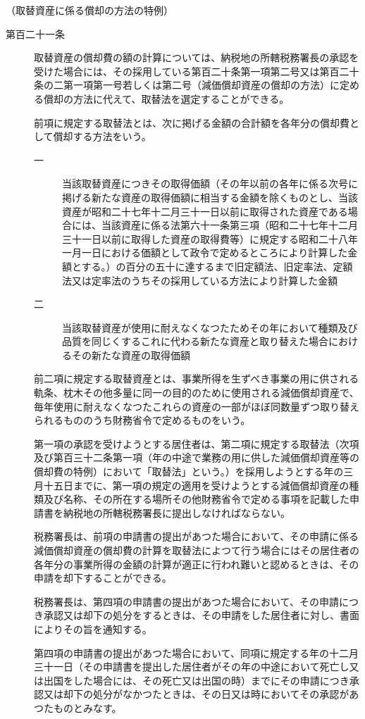 \documentclass[twocolumn,a4j,10pt]{ltjtarticle}
\begin{document}
\noindent\hspace{10pt}（取替資産に係る償却の方法の特例）
\begin{description}
\item[第百二十一条]取替資産の償却費の額の計算については、納税地の所轄税務署長の承認を受けた場合には、その採用している第百二十条第一項第二号又は第百二十条の二第一項第一号若しくは第二号（減価償却資産の償却の方法）に定める償却の方法に代えて、取替法を選定することができる。
\item[]前項に規定する取替法とは、次に掲げる金額の合計額を各年分の償却費として償却する方法をいう。
\begin{description}
\item[一]当該取替資産につきその取得価額（その年以前の各年に係る次号に掲げる新たな資産の取得価額に相当する金額を除くものとし、当該資産が昭和二十七年十二月三十一日以前に取得された資産である場合には、当該資産に係る法第六十一条第三項（昭和二十七年十二月三十一日以前に取得した資産の取得費等）に規定する昭和二十八年一月一日における価額として政令で定めるところにより計算した金額とする。）の百分の五十に達するまで旧定額法、旧定率法、定額法又は定率法のうちその採用している方法により計算した金額
\item[二]当該取替資産が使用に耐えなくなつたためその年において種類及び品質を同じくするこれに代わる新たな資産と取り替えた場合におけるその新たな資産の取得価額
\end{description}
\item[]前二項に規定する取替資産とは、事業所得を生ずべき事業の用に供される軌条、枕木その他多量に同一の目的のために使用される減価償却資産で、毎年使用に耐えなくなつたこれらの資産の一部がほぼ同数量ずつ取り替えられるもののうち財務省令で定めるものをいう。
\item[]第一項の承認を受けようとする居住者は、第二項に規定する取替法（次項及び第百三十二条第一項（年の中途で業務の用に供した減価償却資産等の償却費の特例）において「取替法」という。）を採用しようとする年の三月十五日までに、第一項の規定の適用を受けようとする減価償却資産の種類及び名称、その所在する場所その他財務省令で定める事項を記載した申請書を納税地の所轄税務署長に提出しなければならない。
\item[]税務署長は、前項の申請書の提出があつた場合において、その申請に係る減価償却資産の償却費の計算を取替法によつて行う場合にはその居住者の各年分の事業所得の金額の計算が適正に行われ難いと認めるときは、その申請を却下することができる。
\item[]税務署長は、第四項の申請書の提出があつた場合において、その申請につき承認又は却下の処分をするときは、その申請をした居住者に対し、書面によりその旨を通知する。
\item[]第四項の申請書の提出があつた場合において、同項に規定する年の十二月三十一日（その申請書を提出した居住者がその年の中途において死亡し又は出国をした場合には、その死亡又は出国の時）までにその申請につき承認又は却下の処分がなかつたときは、その日又は時においてその承認があつたものとみなす。
\end{description}
\end{document}
